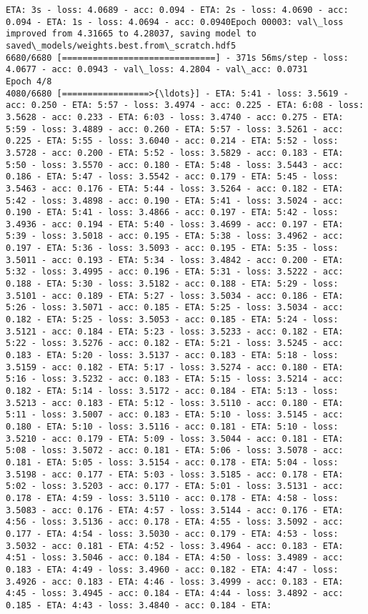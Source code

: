 \documentclass[11pt]{article}
\begin{document}
\begin{Verbatim}[commandchars=\\\{\}]
ETA: 3s - loss: 4.0689 - acc: 0.094 - ETA: 2s - loss: 4.0690 - acc: 0.094 - ETA: 1s - loss: 4.0694 - acc: 0.0940Epoch 00003: val\_loss improved from 4.31665 to 4.28037, saving model to saved\_models/weights.best.from\_scratch.hdf5
6680/6680 [==============================] - 371s 56ms/step - loss: 4.0677 - acc: 0.0943 - val\_loss: 4.2804 - val\_acc: 0.0731
Epoch 4/8
4080/6680 [=================>{\ldots}] - ETA: 5:41 - loss: 3.5619 - acc: 0.250 - ETA: 5:57 - loss: 3.4974 - acc: 0.225 - ETA: 6:08 - loss: 3.5628 - acc: 0.233 - ETA: 6:03 - loss: 3.4740 - acc: 0.275 - ETA: 5:59 - loss: 3.4889 - acc: 0.260 - ETA: 5:57 - loss: 3.5261 - acc: 0.225 - ETA: 5:55 - loss: 3.6040 - acc: 0.214 - ETA: 5:52 - loss: 3.5728 - acc: 0.200 - ETA: 5:52 - loss: 3.5829 - acc: 0.183 - ETA: 5:50 - loss: 3.5570 - acc: 0.180 - ETA: 5:48 - loss: 3.5443 - acc: 0.186 - ETA: 5:47 - loss: 3.5542 - acc: 0.179 - ETA: 5:45 - loss: 3.5463 - acc: 0.176 - ETA: 5:44 - loss: 3.5264 - acc: 0.182 - ETA: 5:42 - loss: 3.4898 - acc: 0.190 - ETA: 5:41 - loss: 3.5024 - acc: 0.190 - ETA: 5:41 - loss: 3.4866 - acc: 0.197 - ETA: 5:42 - loss: 3.4936 - acc: 0.194 - ETA: 5:40 - loss: 3.4699 - acc: 0.197 - ETA: 5:39 - loss: 3.5018 - acc: 0.195 - ETA: 5:38 - loss: 3.4962 - acc: 0.197 - ETA: 5:36 - loss: 3.5093 - acc: 0.195 - ETA: 5:35 - loss: 3.5011 - acc: 0.193 - ETA: 5:34 - loss: 3.4842 - acc: 0.200 - ETA: 5:32 - loss: 3.4995 - acc: 0.196 - ETA: 5:31 - loss: 3.5222 - acc: 0.188 - ETA: 5:30 - loss: 3.5182 - acc: 0.188 - ETA: 5:29 - loss: 3.5101 - acc: 0.189 - ETA: 5:27 - loss: 3.5034 - acc: 0.186 - ETA: 5:26 - loss: 3.5071 - acc: 0.185 - ETA: 5:25 - loss: 3.5034 - acc: 0.182 - ETA: 5:25 - loss: 3.5053 - acc: 0.185 - ETA: 5:24 - loss: 3.5121 - acc: 0.184 - ETA: 5:23 - loss: 3.5233 - acc: 0.182 - ETA: 5:22 - loss: 3.5276 - acc: 0.182 - ETA: 5:21 - loss: 3.5245 - acc: 0.183 - ETA: 5:20 - loss: 3.5137 - acc: 0.183 - ETA: 5:18 - loss: 3.5159 - acc: 0.182 - ETA: 5:17 - loss: 3.5274 - acc: 0.180 - ETA: 5:16 - loss: 3.5232 - acc: 0.183 - ETA: 5:15 - loss: 3.5214 - acc: 0.182 - ETA: 5:14 - loss: 3.5172 - acc: 0.184 - ETA: 5:13 - loss: 3.5213 - acc: 0.183 - ETA: 5:12 - loss: 3.5110 - acc: 0.180 - ETA: 5:11 - loss: 3.5007 - acc: 0.183 - ETA: 5:10 - loss: 3.5145 - acc: 0.180 - ETA: 5:10 - loss: 3.5116 - acc: 0.181 - ETA: 5:10 - loss: 3.5210 - acc: 0.179 - ETA: 5:09 - loss: 3.5044 - acc: 0.181 - ETA: 5:08 - loss: 3.5072 - acc: 0.181 - ETA: 5:06 - loss: 3.5078 - acc: 0.181 - ETA: 5:05 - loss: 3.5154 - acc: 0.178 - ETA: 5:04 - loss: 3.5198 - acc: 0.177 - ETA: 5:03 - loss: 3.5185 - acc: 0.178 - ETA: 5:02 - loss: 3.5203 - acc: 0.177 - ETA: 5:01 - loss: 3.5131 - acc: 0.178 - ETA: 4:59 - loss: 3.5110 - acc: 0.178 - ETA: 4:58 - loss: 3.5083 - acc: 0.176 - ETA: 4:57 - loss: 3.5144 - acc: 0.176 - ETA: 4:56 - loss: 3.5136 - acc: 0.178 - ETA: 4:55 - loss: 3.5092 - acc: 0.177 - ETA: 4:54 - loss: 3.5030 - acc: 0.179 - ETA: 4:53 - loss: 3.5032 - acc: 0.181 - ETA: 4:52 - loss: 3.4964 - acc: 0.183 - ETA: 4:51 - loss: 3.5046 - acc: 0.184 - ETA: 4:50 - loss: 3.4989 - acc: 0.183 - ETA: 4:49 - loss: 3.4960 - acc: 0.182 - ETA: 4:47 - loss: 3.4926 - acc: 0.183 - ETA: 4:46 - loss: 3.4999 - acc: 0.183 - ETA: 4:45 - loss: 3.4945 - acc: 0.184 - ETA: 4:44 - loss: 3.4892 - acc: 0.185 - ETA: 4:43 - loss: 3.4840 - acc: 0.184 - ETA: 
\end{Verbatim}
\end{document}
